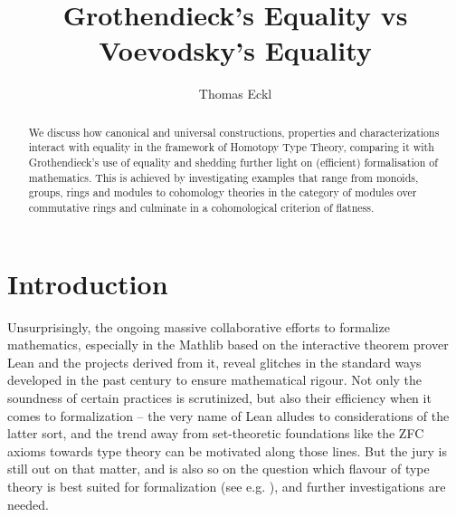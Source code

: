\documentclass{amsart}
\theoremstyle{plain}
\numberwithin{equation}{section} %
\numberwithin{figure}{section} %
\theoremstyle{plain}
\theoremstyle{plain}
\theoremstyle{plain}
\theoremstyle{plain}
\theoremstyle{plain}
\theoremstyle{plain}
\theoremstyle{remark}
\theoremstyle{remark}
\theoremstyle{remark}
\begin{document}
\title{Grothendieck's Equality vs Voevodsky's Equality}




\author{Thomas Eckl}


\keywords{}


\subjclass{}



\address{Thomas Eckl, Department of Mathematical Sciences, The University of Liverpool, Mathematical
               Sciences Building, Liverpool, L69 7ZL, England, U.K.}





\maketitle

\begin{abstract}
We discuss how canonical and universal constructions, properties and characterizations interact with equality in the framework of Homotopy Type Theory, comparing it with Grothendieck's use of equality and shedding further light on (efficient) formalisation of mathematics. This is achieved by investigating examples that range from monoids, groups, rings and modules to cohomology theories in the category of modules over commutative rings and culminate in a cohomological criterion of flatness. 
\end{abstract}


\pagestyle{myheadings}


\setcounter{section}{-1}

\section{Introduction}

Unsurprisingly, the ongoing massive collaborative efforts to formalize mathematics, especially in the Mathlib \cite{Mathlib} based on the interactive theorem prover Lean \cite{Lean} and the projects derived from it, reveal glitches in the standard ways developed in the past century to ensure mathematical rigour. Not only the soundness of certain practices is scrutinized, but also their efficiency when it comes to formalization -- the very name of Lean alludes to considerations of the latter sort, and the trend away from set-theoretic foundations like the ZFC axioms towards type theory can be motivated along those lines. But the jury is still out on that matter, and is also so on the question which flavour of type theory is best suited for formalization (see e.g. \cite{BPL22}), and further investigations are needed.
\end{document}
